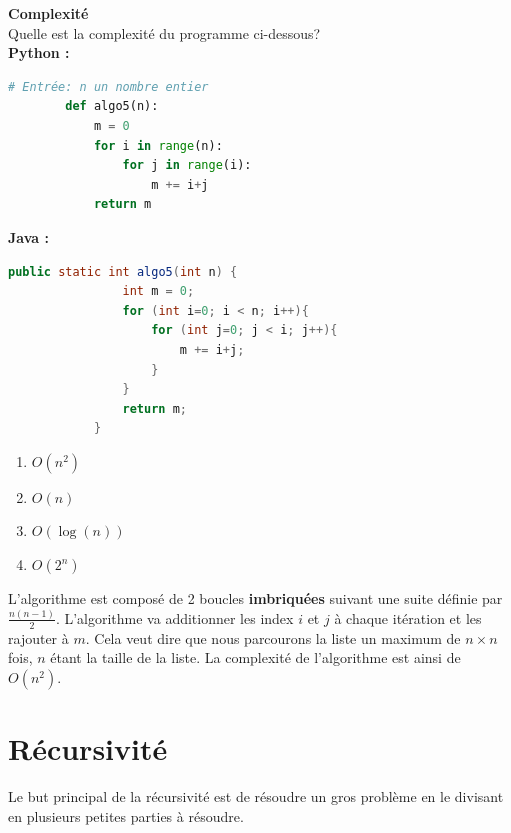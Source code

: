 \newpage

\begin{Exercice}[10 minutes] \textbf{Complexité} \\
    Quelle est la complexité du programme ci-dessous?\\
        \textbf{Python :}
        \begin{lstlisting}[language=Python]
        # Entrée: n un nombre entier
        def algo5(n):
            m = 0
            for i in range(n):
                for j in range(i):
                    m += i+j
            return m
        \end{lstlisting}
        
        \textbf{Java :}
        \begin{lstlisting}[language=Java]
            public static int algo5(int n) {
                int m = 0;
                for (int i=0; i < n; i++){
                    for (int j=0; j < i; j++){
                        m += i+j;
                    }
                }
                return m;
            }
        \end{lstlisting}
    
        \begin{enumerate}
            \item $O(n^2)$
            \item $O(n)$
            \item $O(\log(n))$
            \item $O(2^n)$
        \end{enumerate}

    \begin{solution} 
    L'algorithme est composé de 2 boucles \textbf{imbriquées} suivant une suite définie par $\frac{n(n-1)}{2}$. L'algorithme va additionner les index $i$ et $j$ à chaque itération et les rajouter à $m$.
    Cela veut dire que nous parcourons la liste un maximum de $n \times n$ fois, $n$ étant la taille de la liste. La complexité de l'algorithme est ainsi de $O(n^2)$.
    \end{solution}
    
\end{Exercice}
    
        
\section{Récursivité}

Le but principal de la récursivité est de résoudre un gros problème en le divisant en plusieurs petites parties à résoudre.


